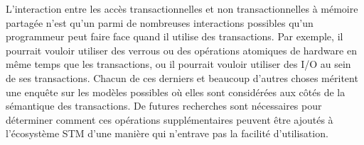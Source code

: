 L'interaction entre les accès transactionnelles et non transactionnelles à mémoire partagée n'est qu'un parmi de nombreuses interactions possibles qu'un programmeur peut faire face quand il utilise des transactions.
Par exemple, il pourrait vouloir utiliser des verrous ou des opérations atomiques de hardware en même temps que les transactions, ou il pourrait vouloir utiliser des I/O au sein de ses transactions.
Chacun de ces derniers et beaucoup d'autres choses méritent une enquête sur les modèles possibles où elles sont considérées aux côtés de la sémantique des transactions.
De futures recherches sont nécessaires pour déterminer comment ces opérations supplémentaires peuvent être ajoutés à l'écosystème STM d'une manière qui n'entrave pas la facilité d'utilisation.

